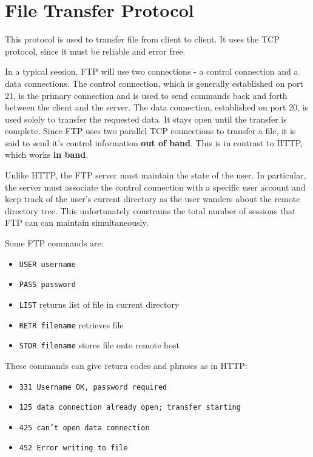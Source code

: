 \documentclass[12pt,letterpaper]{book}
\theoremstyle{definition}
\begin{document}
\section{File Transfer Protocol}

This protocol is used to transfer file from client to client. It uses the TCP protocol, since it must be reliable and error free.

In a typical session, FTP will use two connections - a control connection and a data connections. The control connection, which is generally established on port 21, is the primary connection and is used to send commands back and forth between the client and the server. The data connection, established on port 20, is used solely to transfer the requested data. It stays open until the transfer is complete. Since FTP uses two parallel TCP connections to transfer a file, it is said to send it's control information \textbf{out of band}. This is in contrast to HTTP, which works \textbf{in band}.

Unlike HTTP, the FTP server must maintain the state of the user. In particular, the server must associate the control connection with a specific user account and keep track of the user's current directory as the user wanders about the remote directory tree. This unfortunately constrains the total number of sessions that FTP can can maintain simultaneously.

Some FTP commands are:

\begin{itemize}
  \item \texttt{USER username}
  \item \texttt{PASS password}
  \item \texttt{LIST} returns list of file in current directory
  \item \texttt{RETR filename} retrieves file
  \item \texttt{STOR filename} stores file onto remote host
\end{itemize}

These commands can give return codes and phrases as in HTTP:

\begin{itemize}
  \item \texttt{331 Username OK, password required}
  \item \texttt{125 data connection already open; transfer starting}
  \item \texttt{425 can't open data connection}
  \item \texttt{452 Error writing to file}
\end{itemize}
\end{document}

